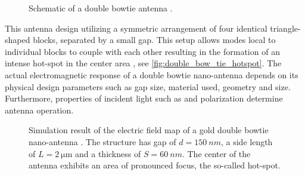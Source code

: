 		\begin{figure}[thp]
				\centering
				\caption[Schematic of a double bowtie antenna]{Schematic of a double bowtie antenna \cite{rahbany2016towards, Rahbany2015, Rahbany2016}.}
				\label{fig::double_bowtie_antenna_schematic}
		\end{figure}

		This antenna design utilizing a symmetric arrangement of four identical triangle-shaped blocks, separated by a small gap. This setup allows \LSP modes local to individual blocks to couple with each other resulting in the formation of an intense hot-spot in the center area \cite{nancy::85}, see \autoref{fig:double_bow_tie_hotspot}. The actual electromagnetic response of a double bowtie nano-antenna depends on its physical design parameters such as gap size, material used, geometry and size. Furthermore, properties of incident light such as \wl and polarization determine antenna operation.

		\begin{figure}[thp]
				\centering
				\label{fig::double_bow_tie_hotspot}
				\caption[Hot-spot of a double bowtie antenna]{Simulation result of the electric field map of a gold double bowtie nano-antenna \cite{rahbany2016towards, Rahbany2015, Rahbany2016}. The structure has gap of $d = \SI{150}{nm}$, a side length of $L = \SI{2}{\micro\meter}$ and a thickness of $S = \SI{60}{nm}$. The center of the antenna exhibits an area of pronounced focus, the so-called hot-spot.}
		\end{figure}


